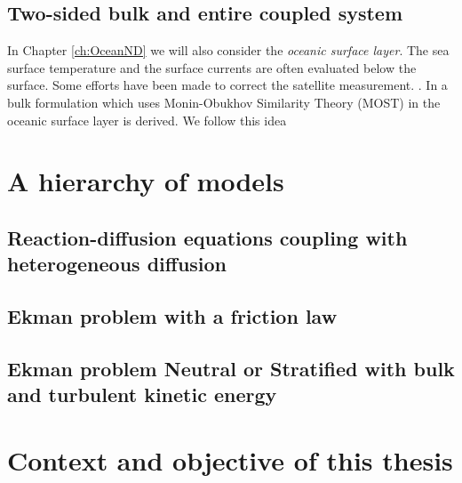 \subsection{Two-sided bulk and entire coupled system}
\label{sec:airseaSCM_twoSided}
In Chapter \ref{ch:OceanND} we will also consider the
\textit{oceanic surface layer}.
The sea surface temperature and the surface currents are often
evaluated below the surface.
Some efforts have been made to correct the satellite measurement.
.
In \citep{pelletier_two-sided_2021} a bulk formulation which
uses Monin-Obukhov Similarity Theory (MOST) in the oceanic
surface layer is derived.
We follow this idea 

\section{A hierarchy of models}
\label{sec:airseaSCM_hierarchy}
\subsection{Reaction-diffusion equations coupling
with heterogeneous diffusion}
\subsection{Ekman problem with a friction law}
\label{sec:airseaSCM_hierarchy_Ekman}
\subsection{Ekman problem Neutral or Stratified with bulk and turbulent kinetic energy}
\section{Context and objective of this thesis}
\label{sec:airseaSCM_context_objectives}
